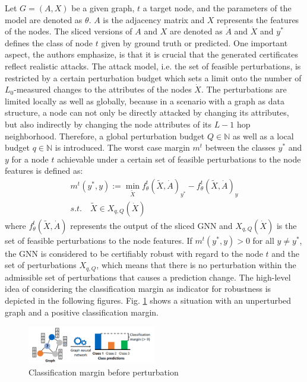 \documentclass[a4paper,preprint]{sig-alternate}
\begin{document}
Let $G = (A, X)$ be a given graph, $t$ a target node, and the parameters of the model are denoted as $\theta$.
$A$ is the adjacency matrix and $X$ represents the features of the nodes. The sliced versions of $A$ and $X$ are denoted 
as $\dot{A}$ and $\dot{X}$ and $y^*$ defines the class of node $t$ given by ground truth or predicted.
One important aspect, the authors emphasize, is that it is crucial that the generated certificates reflect realistic attacks.
The attack model, i.e. the set of feasible perturbations, is restricted by a certain perturbation budget which sets a limit 
onto the number of $L_0$-measured changes to the attributes of the nodes $\dot{X}$.
The perturbations are limited locally as well as globally, because in a scenario with a graph as data structure, a node can not 
only be directly attacked by changing its attributes, but also indirectly by changing the node attributes of its $L-1$ hop 
neighborhood. \cite{Zuegner_2019}
Therefore, a global perturbation budget $Q \in \mathbb{N}$ as well as a local budget $q \in \mathbb{N}$ is introduced.
The worst case margin $m^t$ between the classes $y^*$ and $y$ for a node $t$ achievable under a certain set
of feasible perturbations to the node features is defined as:
\begin{gather} 
\label{eq:1}
    m^t (y^*, y) := \min_{\tilde{X}} f_{\theta}^t(\tilde{X}, \dot{A})_{y^*} - f_{\theta}^t(\tilde{X}, \dot{A})_y \\
    s.t. \quad \tilde{X} \in X_{q, Q} (\dot{X}) \nonumber
\end{gather}
where $f_{\theta}^t(\tilde{X}, \dot{A})$ represents the output of the sliced GNN and $X_{q, Q} (\dot{X})$ is the set
of feasible perturbations to the node features.
If $m^t (y^*, y) > 0$ for all $y \neq y^*$, the GNN is considered to be certifiably robust with regard to the node $t$ and the set of
perturbations $X_{q, Q}$, which means that there is no perturbation within the admissible set of perturbations that causes a prediction change. \cite{Zuegner_2019}
The high-level idea of considering the classification margin as indicator for robustness is depicted in the following figures.
Fig. \ref{fig:before_pert} shows a situation with an unperturbed graph and a positive classification margin.

\begin{figure}[h]
    \centering
    \includegraphics[width=0.5\textwidth]{img/before_pert.png}
    \caption{Classification margin before perturbation \cite{Zuegner_2019}}
    \label{fig:before_pert}
\end{figure}
\end{document}
